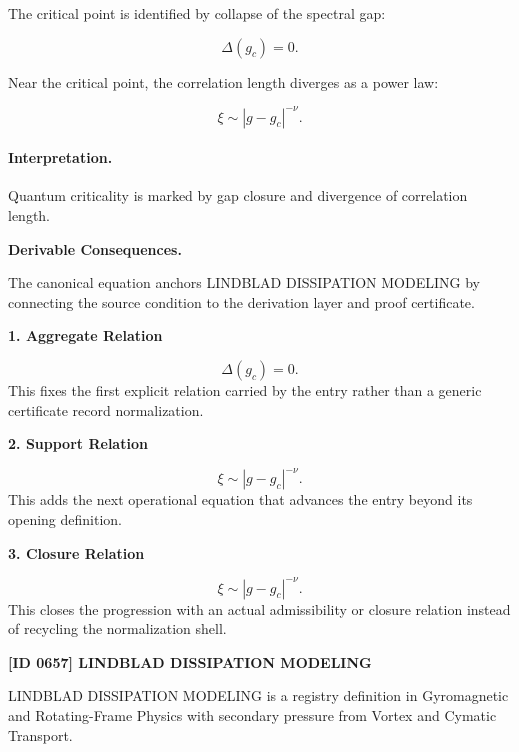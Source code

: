 The critical point is identified by collapse of the spectral gap:

\begin{equation}
\Delta(g_c)=0 .
\end{equation}

Near the critical point, the correlation length diverges as a power law:

\begin{equation}
\boxed{
\xi \sim |g-g_c|^{-\nu}.
}
\end{equation}

\paragraph{Interpretation.}
Quantum criticality is marked by gap closure and divergence of correlation length.

\par\vspace{0.35em}
\noindent\textbf{Derivable Consequences.}\quad
\begingroup
\footnotesize
\raggedright
The canonical equation anchors LINDBLAD DISSIPATION MODELING by connecting the source condition to the derivation layer and proof certificate.
\par\endgroup

\noindent\textbf{1. Aggregate Relation}\par
\[
\Delta(g_c)=0.
\]
\noindent This fixes the first explicit relation carried by the entry rather than a generic certificate record normalization.\par
\noindent\textbf{2. Support Relation}\par
\[
\xi \sim |g-g_c|^{-\nu}.
\]
\noindent This adds the next operational equation that advances the entry beyond its opening definition.\par
\noindent\textbf{3. Closure Relation}\par
\[
\boxed{ \xi \sim |g-g_c|^{-\nu}. }
\]
\noindent This closes the progression with an actual admissibility or closure relation instead of recycling the normalization shell.\par

\clearpage
\noindent\textbf{[ID 0657] LINDBLAD DISSIPATION MODELING}\par
\vspace{0.35em}
\begingroup\small
{}
LINDBLAD DISSIPATION MODELING is a registry definition in Gyromagnetic and Rotating-Frame Physics with secondary pressure from Vortex and Cymatic Transport.

